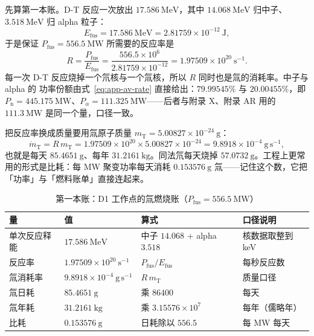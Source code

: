 先算第一本账。D-T 反应一次放出 $17.586\ \mathrm{MeV}$，其中 $14.068\ \mathrm{MeV}$
归中子、$3.518\ \mathrm{MeV}$ 归 alpha 粒子：
\begin{equation}
E_\mathrm{fus}=17.586\ \mathrm{MeV}=2.81759\times10^{-12}\ \mathrm{J},
\label{eq:app-av-rate}
\end{equation}
于是保证 $P_\mathrm{fus}=556.5\ \mathrm{MW}$ 所需要的反应率是
\begin{equation}
R=\frac{P_\mathrm{fus}}{E_\mathrm{fus}}
=\frac{556.5\times10^{6}}{2.81759\times10^{-12}}
=1.97509\times10^{20}\ \mathrm{s^{-1}}.
\label{eq:app-av-burn}
\end{equation}
每一次 D-T 反应烧掉一个氘核与一个氚核，所以 $R$ 同时也是氚的消耗率。中子与 alpha 的
功率份额由式~\eqref{eq:app-av-rate} 直接给出：$79.99545\%$ 与 $20.00455\%$，即
$P_\mathrm{n}=445.175\ \mathrm{MW}$、$P_\alpha=111.325\ \mathrm{MW}$——后者与附录 X、附录 AR
用的 $111.3\ \mathrm{MW}$ 是同一个量，口径一致。

把反应率换成质量要用氚原子质量 $m_\mathrm{T}=5.00827\times10^{-24}\ \mathrm{g}$：
\begin{equation}
\dot m_\mathrm{T}=R\,m_\mathrm{T}
=1.97509\times10^{20}\times5.00827\times10^{-24}
=9.8918\times10^{-4}\ \mathrm{g\,s^{-1}},
\label{eq:app-av-spec}
\end{equation}
也就是每天 $85.4651\ \mathrm{g}$、每年 $31.2161\ \mathrm{kg}$。同法氘每天烧掉
$57.0732\ \mathrm{g}$。工程上更常用的形式是比耗：每 MW 聚变功率每天消耗
$0.153576\ \mathrm{g}$ 氚——记住这个数，它把「功率」与「燃料账单」直接连起来。

\begin{table}[htbp]
\centering
\small
\caption{第一本账：D1 工作点的氚燃烧账（$P_\mathrm{fus}=556.5\ \mathrm{MW}$）}
\label{tab:app-av-books}
\begin{tabular}{p{3.6cm}p{3.4cm}p{4.0cm}p{4.0cm}}
\hline
量 & 值 & 算式 & 口径说明 \\
\hline
单次反应释能 & $17.586\ \mathrm{MeV}$ & 中子 $14.068$ + alpha $3.518$ & 核数据取整到 keV \\
反应率 & $1.97509\times10^{20}\ \mathrm{s^{-1}}$ & $P_\mathrm{fus}/E_\mathrm{fus}$ & 每秒反应数 \\
氚消耗率 & $9.8918\times10^{-4}\ \mathrm{g\,s^{-1}}$ & $R\,m_\mathrm{T}$ & 质量口径 \\
氚日耗 & $85.4651\ \mathrm{g}$ & 乘 $86400$ & 每天 \\
氚年耗 & $31.2161\ \mathrm{kg}$ & 乘 $3.15576\times10^{7}$ & 每年（儒略年） \\
比耗 & $0.153576\ \mathrm{g}$ & 日耗除以 $556.5$ & 每 MW 每天 \\
\hline
\end{tabular}
\end{table}

